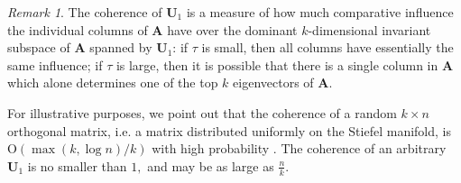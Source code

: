 \documentclass[11pt,letterpaper,twoside,reqno,nosumlimits]{amsart}
\newcommand{\mat}[1]{\ensuremath{\bm{#1}}}
\renewcommand{\vec}[1]{\ensuremath{\bm{#1}}}
\theoremstyle{remark}
\newtheorem{remark}{Remark}
\begin{document}
\begin{remark}
The coherence of $\mat{U}_1$ is a measure of how much comparative influence the individual columns of $\mat{A}$ have over the dominant $k$-dimensional invariant subspace of $\mat{A}$ spanned by $\mat{U}_1$: if $\tau$ is small, then all columns have essentially the same influence; if $\tau$ is large, then it is possible that there is a single column in $\mat{A}$ which alone determines one of the top $k$ eigenvectors of $\mat{A}.$

% 

For illustrative purposes, we point out that the coherence of a random $k \times n$ orthogonal matrix, i.e. a matrix distributed uniformly on the Stiefel manifold, is $\mathrm{O}(\max(k, \log n)/k)$ with high probability \cite{CR09}. The coherence of an arbitrary $\mat{U}_1$ is no smaller than $1,$ and may be as large as $\frac{n}{k}.$ 
\end{remark}
\end{document}
